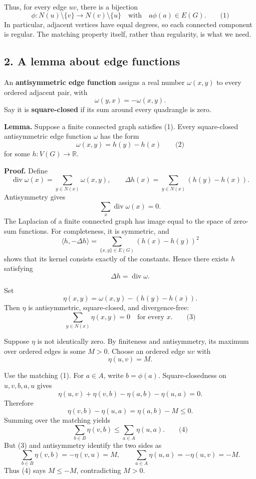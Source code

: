 \documentclass[
  11pt,
  a4paper,
]{article}
\begin{document}
Thus, for every edge \(uv\), there is a bijection \[
\phi:N(u)\setminus\{v\}\longrightarrow N(v)\setminus\{u\}
\quad\text{with}\quad a\phi(a)\in E(G).
\qquad\text{(1)}
\] In particular, adjacent vertices have equal degrees, so each
connected component is regular. The matching property itself, rather
than regularity, is what we need.

\subsection{2. A lemma about edge
functions}\label{a-lemma-about-edge-functions}

An \textbf{antisymmetric edge function} assigns a real number
\(\omega(x,y)\) to every ordered adjacent pair, with \[
\omega(y,x)=-\omega(x,y).
\] Say it is \textbf{square-closed} if its sum around every quadrangle
is zero.

\textbf{Lemma.} Suppose a finite connected graph satisfies (1). Every
square-closed antisymmetric edge function \(\omega\) has the form \[
\omega(x,y)=h(y)-h(x)
\qquad\text{(2)}
\] for some \(h:V(G)\to\mathbb R\).

\textbf{Proof.} Define \[
\operatorname{div}\omega(x)=\sum_{y\in N(x)}\omega(x,y),
\qquad
\Delta h(x)=\sum_{y\in N(x)}(h(y)-h(x)).
\] Antisymmetry gives \[
\sum_x\operatorname{div}\omega(x)=0.
\] The Laplacian of a finite connected graph has image equal to the
space of zero-sum functions. For completeness, it is symmetric, and \[
\langle h,-\Delta h\rangle
=\sum_{\{x,y\}\in E(G)}(h(x)-h(y))^2
\] shows that its kernel consists exactly of the constants. Hence there
exists \(h\) satisfying \[
\Delta h=\operatorname{div}\omega.
\]

Set \[
\eta(x,y)=\omega(x,y)-(h(y)-h(x)).
\] Then \(\eta\) is antisymmetric, square-closed, and divergence-free:
\[
\sum_{y\in N(x)}\eta(x,y)=0
\quad\text{for every }x.
\qquad\text{(3)}
\]

Suppose \(\eta\) is not identically zero. By finiteness and
antisymmetry, its maximum over ordered edges is some \(M>0\). Choose an
ordered edge \(uv\) with \[
\eta(u,v)=M.
\]

Use the matching (1). For \(a\in A\), write \(b=\phi(a)\).
Square-closedness on \(u,v,b,a,u\) gives \[
\eta(u,v)+\eta(v,b)-\eta(a,b)-\eta(u,a)=0.
\] Therefore \[
\eta(v,b)-\eta(u,a)=\eta(a,b)-M\le 0.
\] Summing over the matching yields \[
\sum_{b\in B}\eta(v,b)
\le
\sum_{a\in A}\eta(u,a).
\qquad\text{(4)}
\] But (3) and antisymmetry identify the two sides as \[
\sum_{b\in B}\eta(v,b)=-\eta(v,u)=M,
\qquad
\sum_{a\in A}\eta(u,a)=-\eta(u,v)=-M.
\] Thus (4) says \(M\le -M\), contradicting \(M>0\).
\end{document}

